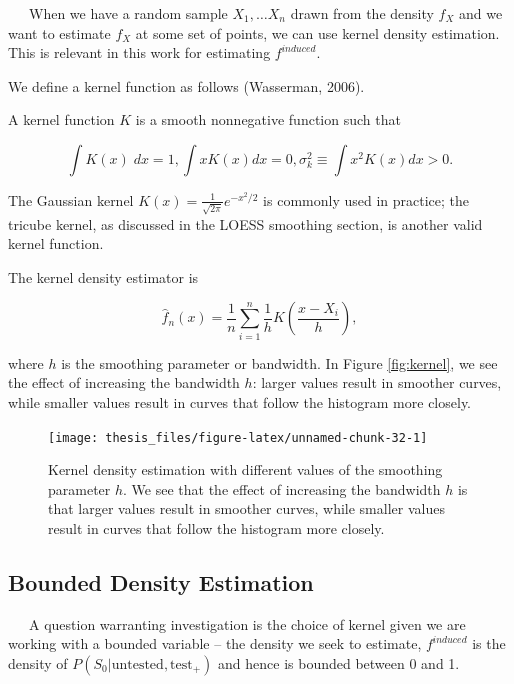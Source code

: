 \documentclass[12pt,twoside]{smiththesis}
\begin{document}
~~~When we have a random sample \(X_1,\dots X_n\) drawn from the density \(f_X\) and we want to estimate \(f_X\) at some set of points, we can use kernel density estimation. This is relevant in this work for estimating \(f^{induced}\).

We define a kernel function as follows (Wasserman, 2006).
\begin{tcolorbox}[title=Definition: Kernel Function]

A kernel function $K$ is a smooth nonnegative function such that 

$$\int K(x) \; dx = 1, \int x K(x) dx = 0, \sigma^2_k \equiv \int x^2 K(x) dx > 0.$$ 
\end{tcolorbox}
The Gaussian kernel \(K(x) = \frac{1}{\sqrt{2\pi}}e^{-x^2/2}\) is commonly used in practice; the tricube kernel, as discussed in the LOESS smoothing section, is another valid kernel function.

The kernel density estimator is

\[\hat f_n(x) = \frac 1n \sum_{i=1}^n \frac 1h K\left(\dfrac{x-X_i}{h} \right),\]

\noindent where \(h\) is the smoothing parameter or bandwidth. In Figure \ref{fig:kernel}, we see the effect of increasing the bandwidth \(h\): larger values result in smoother curves, while smaller values result in curves that follow the histogram more closely.
\begin{figure}

{\centering \texttt{[image: thesis\_files/figure-latex/unnamed-chunk-32-1]} 

}

\caption{\label{fig:kernel}Kernel density estimation with different values of the smoothing parameter $h$. We see that the effect of increasing the bandwidth $h$ is that larger values result in smoother curves, while smaller values result in curves that follow the histogram more closely.}\label{fig:unnamed-chunk-32}
\end{figure}
\hypertarget{bounded-density-estimation}{%
\subsection{Bounded Density Estimation}\label{bounded-density-estimation}}

~~~A question warranting investigation is the choice of kernel given we are working with a bounded variable -- the density we seek to estimate, \(f^{induced}\) is the density of \(P(S_0|\text{untested}, \text{test}_+)\) and hence is bounded between 0 and 1.
\end{document}
